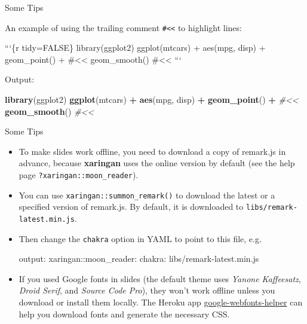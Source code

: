 \documentclass[ignorenonframetext,]{beamer}
\newenvironment{Shaded}{\begin{snugshade}}{\end{snugshade}}
\newcommand{\AttributeTok}[1]{\textcolor[rgb]{0.77,0.63,0.00}{#1}}
\newcommand{\BaseNTok}[1]{\textcolor[rgb]{0.00,0.00,0.81}{#1}}
\newcommand{\CommentTok}[1]{\textcolor[rgb]{0.56,0.35,0.01}{\textit{#1}}}
\newcommand{\FunctionTok}[1]{\textcolor[rgb]{0.00,0.00,0.00}{#1}}
\newcommand{\KeywordTok}[1]{\textcolor[rgb]{0.13,0.29,0.53}{\textbf{#1}}}
\newcommand{\NormalTok}[1]{#1}
\newcommand{\OperatorTok}[1]{\textcolor[rgb]{0.81,0.36,0.00}{\textbf{#1}}}
\newcommand{\StringTok}[1]{\textcolor[rgb]{0.31,0.60,0.02}{#1}}
\begin{document}
\begin{frame}[fragile]{Some Tips}
\protect\hypertarget{some-tips-5}{}

An example of using the trailing comment
\texttt{\#\textless{}\textless{}} to highlight lines:

\begin{Shaded}
\begin{Highlighting}[]
\BaseNTok{```\{r tidy=FALSE\}}
\BaseNTok{library(ggplot2)}
\BaseNTok{ggplot(mtcars) + }
\BaseNTok{  aes(mpg, disp) + }
\BaseNTok{  geom_point() +   #<<}
\BaseNTok{  geom_smooth()    #<<}
\BaseNTok{```}
\end{Highlighting}
\end{Shaded}

Output:

\begin{Shaded}
\begin{Highlighting}[]
\KeywordTok{library}\NormalTok{(ggplot2)}
\KeywordTok{ggplot}\NormalTok{(mtcars) }\OperatorTok{+}\StringTok{ }
\StringTok{  }\KeywordTok{aes}\NormalTok{(mpg, disp) }\OperatorTok{+}\StringTok{ }
\StringTok{  }\KeywordTok{geom_point}\NormalTok{() }\OperatorTok{+}\StringTok{   }\CommentTok{#<<}
\StringTok{  }\KeywordTok{geom_smooth}\NormalTok{()    }\CommentTok{#<<}
\end{Highlighting}
\end{Shaded}

\end{frame}

\begin{frame}[fragile]{Some Tips}
\protect\hypertarget{some-tips-6}{}

\begin{itemize}
\item
  To make slides work offline, you need to download a copy of remark.js
  in advance, because \textbf{xaringan} uses the online version by
  default (see the help page \texttt{?xaringan::moon\_reader}).
\item
  You can use \texttt{xaringan::summon\_remark()} to download the latest
  or a specified version of remark.js. By default, it is downloaded to
  \texttt{libs/remark-latest.min.js}.
\item
  Then change the \texttt{chakra} option in YAML to point to this file,
  e.g.

\begin{Shaded}
\begin{Highlighting}[]
\FunctionTok{output:}
  \FunctionTok{xaringan:}\AttributeTok{:moon_reader:}
    \FunctionTok{chakra:}\AttributeTok{ libs/remark-latest.min.js}
\end{Highlighting}
\end{Shaded}
\item
  If you used Google fonts in slides (the default theme uses
  \emph{Yanone Kaffeesatz}, \emph{Droid Serif}, and \emph{Source Code
  Pro}), they won't work offline unless you download or install them
  locally. The Heroku app
  \href{https://google-webfonts-helper.herokuapp.com/fonts}{google-webfonts-helper}
  can help you download fonts and generate the necessary CSS.
\end{itemize}

\end{frame}
\end{document}
